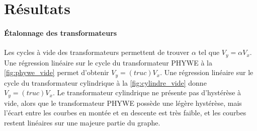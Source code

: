 \section{Résultats}

\paragraph{Étalonnage des transformateurs}
Les cycles à vide des transformateurs permettent de trouver \(\alpha\) tel que \(V_y = \alpha V_x\). Une régression linéaire sur le cycle du transformateur PHYWE à la \autoref{fig:phywe_vide} permet d'obtenir \(V_y = (truc) V_x\). Une régression linéaire sur le cycle du transformateur cylindrique à la \autoref{fig:cylindre_vide} donne \(V_y = (truc) V_x\). Le transformateur cylindrique ne présente pas d'hystérèse à vide, alors que le transformateur PHYWE possède une légère hystérèse, mais l'écart entre les courbes en montée et en descente est très faible, et les courbes restent linéaires sur une majeure partie du graphe.

